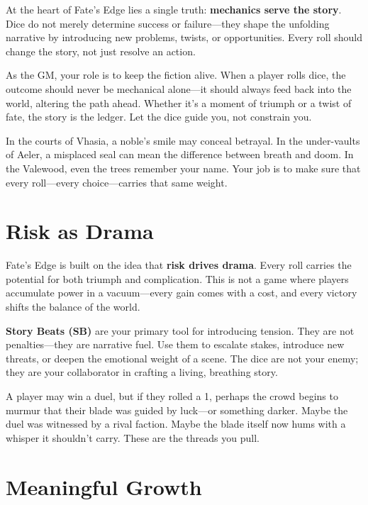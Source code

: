 At the heart of Fate's Edge lies a single truth: \textbf{mechanics serve the story}. Dice do not merely determine success or failure---they shape the unfolding narrative by introducing new problems, twists, or opportunities. Every roll should change the story, not just resolve an action.

As the GM, your role is to keep the fiction alive. When a player rolls dice, the outcome should never be mechanical alone---it should always feed back into the world, altering the path ahead. Whether it's a moment of triumph or a twist of fate, the story is the ledger. Let the dice guide you, not constrain you.

In the courts of Vhasia, a noble's smile may conceal betrayal. In the under-vaults of Aeler, a misplaced seal can mean the difference between breath and doom. In the Valewood, even the trees remember your name. Your job is to make sure that every roll---every choice---carries that same weight.

\section*{Risk as Drama}

Fate's Edge is built on the idea that \textbf{risk drives drama}. Every roll carries the potential for both triumph and complication. This is not a game where players accumulate power in a vacuum---every gain comes with a cost, and every victory shifts the balance of the world.

\textbf{Story Beats (SB)} are your primary tool for introducing tension. They are not penalties---they are narrative fuel. Use them to escalate stakes, introduce new threats, or deepen the emotional weight of a scene. The dice are not your enemy; they are your collaborator in crafting a living, breathing story.

A player may win a duel, but if they rolled a 1, perhaps the crowd begins to murmur that their blade was guided by luck---or something darker. Maybe the duel was witnessed by a rival faction. Maybe the blade itself now hums with a whisper it shouldn't carry. These are the threads you pull.

\section*{Meaningful Growth}

